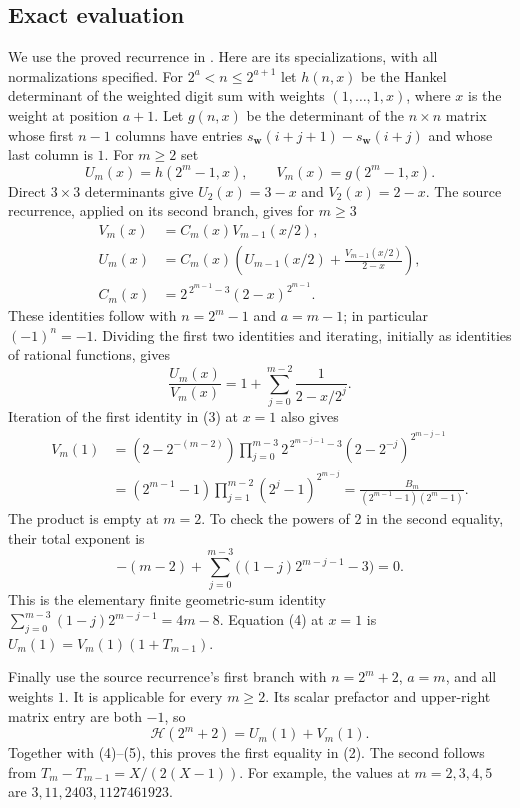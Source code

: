 \documentclass[11pt]{article}
\newcommand{\HH}{\mathcal H}
\begin{document}
\subsection*{Exact evaluation}
We use the proved recurrence in \cite[Theorem 4.2 and Proposition 4.3]{SU}.
Here are its specializations, with all normalizations specified.
For $2^a<n\le2^{a+1}$ let $h(n,x)$ be the Hankel determinant of
the weighted digit sum with weights $(1,\ldots,1,x)$, where $x$
is the weight at position $a+1$. Let $g(n,x)$ be the determinant
of the $n\times n$ matrix whose first $n-1$ columns have entries
$s_{\mathbf w}(i+j+1)-s_{\mathbf w}(i+j)$ and whose last column is $1$.
For $m\ge2$ set
\[
 U_m(x)=h(2^m-1,x),\qquad V_m(x)=g(2^m-1,x).
\]
Direct $3\times3$ determinants give $U_2(x)=3-x$ and $V_2(x)=2-x$.
The source recurrence, applied on its second branch, gives for $m\ge3$
\[
 \begin{aligned}
 V_m(x)&=C_m(x)V_{m-1}(x/2),\\
 U_m(x)&=C_m(x)\left(U_{m-1}(x/2)+\frac{V_{m-1}(x/2)}{2-x}\right),\\
 C_m(x)&=2^{\,2^{m-1}-3}(2-x)^{2^{m-1}}.
 \end{aligned}                                                \tag{3}
\]
These identities follow with $n=2^m-1$ and $a=m-1$; in particular
$(-1)^n=-1$. Dividing the first two identities and iterating, initially
as identities of rational functions, gives
\[
 \frac{U_m(x)}{V_m(x)}
 =1+\sum_{j=0}^{m-2}\frac1{2-x/2^j}.                          \tag{4}
\]
Iteration of the first identity in (3) at $x=1$ also gives
\[
 \begin{aligned}
 V_m(1)
 &=\left(2-2^{-(m-2)}\right)
   \prod_{j=0}^{m-3}
    2^{\,2^{m-j-1}-3}\left(2-2^{-j}\right)^{2^{m-j-1}}\\
 &=(2^{m-1}-1)\prod_{j=1}^{m-2}(2^j-1)^{2^{m-j}}
   =\frac{B_m}{(2^{m-1}-1)(2^m-1)}.
 \end{aligned}                                                \tag{5}
\]
The product is empty at $m=2$. To check the powers of $2$ in the
second equality, their total exponent is
\[
 -(m-2)+\sum_{j=0}^{m-3}\bigl((1-j)2^{m-j-1}-3\bigr)=0.
\]
This is the elementary finite geometric-sum identity
$\sum_{j=0}^{m-3}(1-j)2^{m-j-1}=4m-8$.
Equation (4) at $x=1$ is $U_m(1)=V_m(1)(1+T_{m-1})$.

Finally use the source recurrence's first branch with $n=2^m+2$,
$a=m$, and all weights $1$. It is applicable for every $m\ge2$.
Its scalar prefactor and upper-right matrix entry are both $-1$,
so
\[
 \HH(2^m+2)=U_m(1)+V_m(1).
\]
Together with (4)--(5), this proves the first equality in (2).
The second follows from $T_m-T_{m-1}=X/(2(X-1))$.
For example, the values at $m=2,3,4,5$ are
$3,11,2403,1127461923$.
\end{document}
